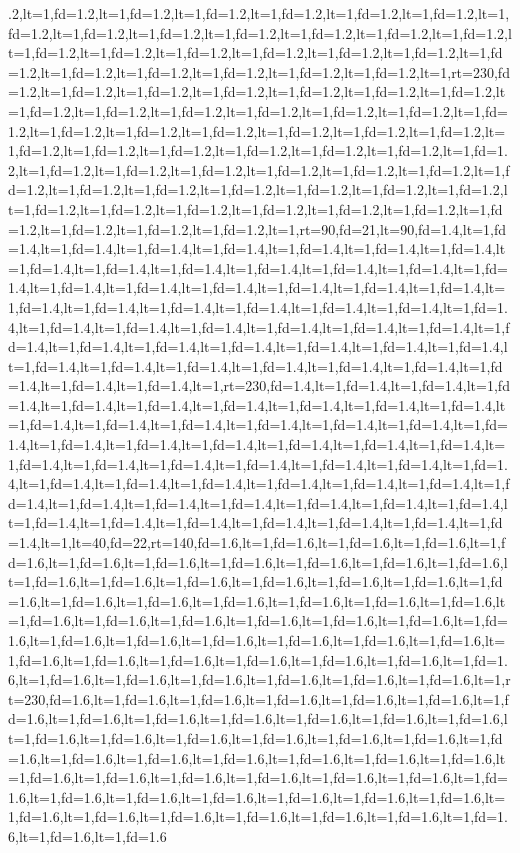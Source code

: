 \documentclass[a4paper,10pt]{article}
\begin{document}
.2,lt=1,fd=1.2,lt=1,fd=1.2,lt=1,fd=1.2,lt=1,fd=1.2,lt=1,fd=1.2,lt=1,fd=1.2,lt=1,fd=1.2,lt=1,fd=1.2,lt=1,fd=1.2,lt=1,fd=1.2,lt=1,fd=1.2,lt=1,fd=1.2,lt=1,fd=1.2,lt=1,fd=1.2,lt=1,fd=1.2,lt=1,fd=1.2,lt=1,fd=1.2,lt=1,fd=1.2,lt=1,fd=1.2,lt=1,fd=1.2,lt=1,fd=1.2,lt=1,fd=1.2,lt=1,fd=1.2,lt=1,fd=1.2,lt=1,fd=1.2,lt=1,rt=230,fd=1.2,lt=1,fd=1.2,lt=1,fd=1.2,lt=1,fd=1.2,lt=1,fd=1.2,lt=1,fd=1.2,lt=1,fd=1.2,lt=1,fd=1.2,lt=1,fd=1.2,lt=1,fd=1.2,lt=1,fd=1.2,lt=1,fd=1.2,lt=1,fd=1.2,lt=1,fd=1.2,lt=1,fd=1.2,lt=1,fd=1.2,lt=1,fd=1.2,lt=1,fd=1.2,lt=1,fd=1.2,lt=1,fd=1.2,lt=1,fd=1.2,lt=1,fd=1.2,lt=1,fd=1.2,lt=1,fd=1.2,lt=1,fd=1.2,lt=1,fd=1.2,lt=1,fd=1.2,lt=1,fd=1.2,lt=1,fd=1.2,lt=1,fd=1.2,lt=1,fd=1.2,lt=1,fd=1.2,lt=1,fd=1.2,lt=1,fd=1.2,lt=1,fd=1.2,lt=1,fd=1.2,lt=1,fd=1.2,lt=1,fd=1.2,lt=1,fd=1.2,lt=1,fd=1.2,lt=1,fd=1.2,lt=1,fd=1.2,lt=1,fd=1.2,lt=1,fd=1.2,lt=1,fd=1.2,lt=1,fd=1.2,lt=1,fd=1.2,lt=1,fd=1.2,lt=1,fd=1.2,lt=1,fd=1.2,lt=1,rt=90,fd=21,lt=90,fd=1.4,lt=1,fd=1.4,lt=1,fd=1.4,lt=1,fd=1.4,lt=1,fd=1.4,lt=1,fd=1.4,lt=1,fd=1.4,lt=1,fd=1.4,lt=1,fd=1.4,lt=1,fd=1.4,lt=1,fd=1.4,lt=1,fd=1.4,lt=1,fd=1.4,lt=1,fd=1.4,lt=1,fd=1.4,lt=1,fd=1.4,lt=1,fd=1.4,lt=1,fd=1.4,lt=1,fd=1.4,lt=1,fd=1.4,lt=1,fd=1.4,lt=1,fd=1.4,lt=1,fd=1.4,lt=1,fd=1.4,lt=1,fd=1.4,lt=1,fd=1.4,lt=1,fd=1.4,lt=1,fd=1.4,lt=1,fd=1.4,lt=1,fd=1.4,lt=1,fd=1.4,lt=1,fd=1.4,lt=1,fd=1.4,lt=1,fd=1.4,lt=1,fd=1.4,lt=1,fd=1.4,lt=1,fd=1.4,lt=1,fd=1.4,lt=1,fd=1.4,lt=1,fd=1.4,lt=1,fd=1.4,lt=1,fd=1.4,lt=1,fd=1.4,lt=1,fd=1.4,lt=1,fd=1.4,lt=1,fd=1.4,lt=1,fd=1.4,lt=1,fd=1.4,lt=1,fd=1.4,lt=1,fd=1.4,lt=1,rt=230,fd=1.4,lt=1,fd=1.4,lt=1,fd=1.4,lt=1,fd=1.4,lt=1,fd=1.4,lt=1,fd=1.4,lt=1,fd=1.4,lt=1,fd=1.4,lt=1,fd=1.4,lt=1,fd=1.4,lt=1,fd=1.4,lt=1,fd=1.4,lt=1,fd=1.4,lt=1,fd=1.4,lt=1,fd=1.4,lt=1,fd=1.4,lt=1,fd=1.4,lt=1,fd=1.4,lt=1,fd=1.4,lt=1,fd=1.4,lt=1,fd=1.4,lt=1,fd=1.4,lt=1,fd=1.4,lt=1,fd=1.4,lt=1,fd=1.4,lt=1,fd=1.4,lt=1,fd=1.4,lt=1,fd=1.4,lt=1,fd=1.4,lt=1,fd=1.4,lt=1,fd=1.4,lt=1,fd=1.4,lt=1,fd=1.4,lt=1,fd=1.4,lt=1,fd=1.4,lt=1,fd=1.4,lt=1,fd=1.4,lt=1,fd=1.4,lt=1,fd=1.4,lt=1,fd=1.4,lt=1,fd=1.4,lt=1,fd=1.4,lt=1,fd=1.4,lt=1,fd=1.4,lt=1,fd=1.4,lt=1,fd=1.4,lt=1,fd=1.4,lt=1,fd=1.4,lt=1,fd=1.4,lt=1,fd=1.4,lt=1,lt=40,fd=22,rt=140,fd=1.6,lt=1,fd=1.6,lt=1,fd=1.6,lt=1,fd=1.6,lt=1,fd=1.6,lt=1,fd=1.6,lt=1,fd=1.6,lt=1,fd=1.6,lt=1,fd=1.6,lt=1,fd=1.6,lt=1,fd=1.6,lt=1,fd=1.6,lt=1,fd=1.6,lt=1,fd=1.6,lt=1,fd=1.6,lt=1,fd=1.6,lt=1,fd=1.6,lt=1,fd=1.6,lt=1,fd=1.6,lt=1,fd=1.6,lt=1,fd=1.6,lt=1,fd=1.6,lt=1,fd=1.6,lt=1,fd=1.6,lt=1,fd=1.6,lt=1,fd=1.6,lt=1,fd=1.6,lt=1,fd=1.6,lt=1,fd=1.6,lt=1,fd=1.6,lt=1,fd=1.6,lt=1,fd=1.6,lt=1,fd=1.6,lt=1,fd=1.6,lt=1,fd=1.6,lt=1,fd=1.6,lt=1,fd=1.6,lt=1,fd=1.6,lt=1,fd=1.6,lt=1,fd=1.6,lt=1,fd=1.6,lt=1,fd=1.6,lt=1,fd=1.6,lt=1,fd=1.6,lt=1,fd=1.6,lt=1,fd=1.6,lt=1,fd=1.6,lt=1,fd=1.6,lt=1,fd=1.6,lt=1,fd=1.6,lt=1,rt=230,fd=1.6,lt=1,fd=1.6,lt=1,fd=1.6,lt=1,fd=1.6,lt=1,fd=1.6,lt=1,fd=1.6,lt=1,fd=1.6,lt=1,fd=1.6,lt=1,fd=1.6,lt=1,fd=1.6,lt=1,fd=1.6,lt=1,fd=1.6,lt=1,fd=1.6,lt=1,fd=1.6,lt=1,fd=1.6,lt=1,fd=1.6,lt=1,fd=1.6,lt=1,fd=1.6,lt=1,fd=1.6,lt=1,fd=1.6,lt=1,fd=1.6,lt=1,fd=1.6,lt=1,fd=1.6,lt=1,fd=1.6,lt=1,fd=1.6,lt=1,fd=1.6,lt=1,fd=1.6,lt=1,fd=1.6,lt=1,fd=1.6,lt=1,fd=1.6,lt=1,fd=1.6,lt=1,fd=1.6,lt=1,fd=1.6,lt=1,fd=1.6,lt=1,fd=1.6,lt=1,fd=1.6,lt=1,fd=1.6,lt=1,fd=1.6,lt=1,fd=1.6,lt=1,fd=1.6,lt=1,fd=1.6,lt=1,fd=1.6,lt=1,fd=1.6,lt=1,fd=1.6,lt=1,fd=1.6,lt=1,fd=1.6,lt=1,fd=1.6,lt=1,fd=1.6
\end{document}

